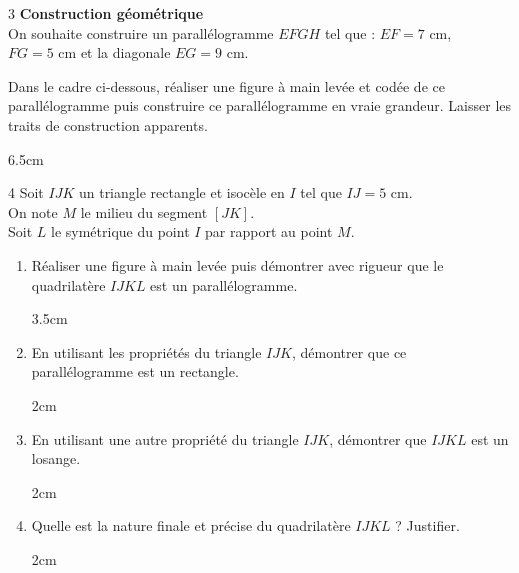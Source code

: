 \documentclass[a4paper]{book}
\begin{document}
{    \begin{exerciceNote}{3}
        \textbf{Construction géométrique} \\
        On souhaite construire un parallélogramme $EFGH$ tel que : 
        $EF = 7\text{ cm}$, $FG = 5\text{ cm}$ et la diagonale $EG = 9\text{ cm}$.
        
        Dans le cadre ci-dessous, réaliser une figure à main levée et codée de ce parallélogramme puis construire ce parallélogramme en vraie grandeur. Laisser les traits de construction apparents.

        \begin{ZoneReponse}{6.5cm}
        \end{ZoneReponse} 
    \end{exerciceNote}

    
    \begin{exerciceNote}{4}
        Soit $IJK$ un triangle rectangle et isocèle en $I$ tel que $IJ = 5\text{ cm}$. \\
        On note $M$ le milieu du segment $[JK]$. \\
        Soit $L$ le symétrique du point $I$ par rapport au point $M$.
    
        \begin{enumerate}
            \item Réaliser une figure à main levée puis démontrer avec rigueur que le quadrilatère $IJKL$ est un parallélogramme.
            \begin{ZoneReponse}{3.5cm}
            \end{ZoneReponse}
            
            \item En utilisant les propriétés du triangle $IJK$, démontrer que ce parallélogramme est un rectangle.
            \begin{ZoneReponse}{2cm}
            \end{ZoneReponse}
            
            \item En utilisant une autre propriété du triangle $IJK$, démontrer que $IJKL$ est un losange.
            \begin{ZoneReponse}{2cm}
            \end{ZoneReponse}
            
            \item Quelle est la nature finale et précise du quadrilatère $IJKL$ ? Justifier.
            \begin{ZoneReponse}{2cm}
            \end{ZoneReponse}
        \end{enumerate}
    \end{exerciceNote}

}
\end{document}

